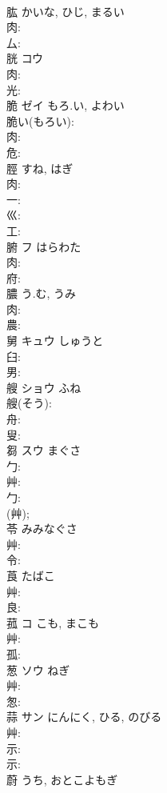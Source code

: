 \documentclass[8pt]{extreport}
\begin{document}
\begin{CJK}{UTF8}{min}
\\	肱		かいな, ひじ, まるい				
\\	肉: 
\\	厶: 
\\	胱	コウ			
\\	肉: 
\\	光: 
\\	脆	ゼイ	もろ.い, よわい		
\\	脆い(もろい): 
\\	肉: 
\\	危: 
\\	脛		すね, はぎ				
\\	肉: 
\\	一: 
\\	巛: 
\\	工: 
\\	腑	フ	はらわた		
\\	肉: 
\\	府: 
\\	膿		う.む, うみ				
\\	肉: 
\\	農: 
\\	舅	キュウ	しゅうと		
\\	臼: 
\\	男: 
\\	艘	ショウ	ふね		
\\	艘(そう): 
\\	舟: 
\\	叟: 
\\	芻	スウ	まぐさ		
\\	勹: 
\\	艸: 
\\	勹: 
\\	(艸); 
\\	苓		みみなぐさ				
\\	艸: 
\\	令: 
\\	莨		たばこ				
\\	艸: 
\\	良: 
\\	菰	コ	こも, まこも		
\\	艸: 
\\	孤: 
\\	葱	ソウ	ねぎ		
\\	艸: 
\\	怱: 
\\	蒜	サン	にんにく, ひる, のびる		
\\	艸: 
\\	示: 
\\	示: 
\\	蔚		うち, おとこよもぎ				

\end{CJK}
\end{document}
